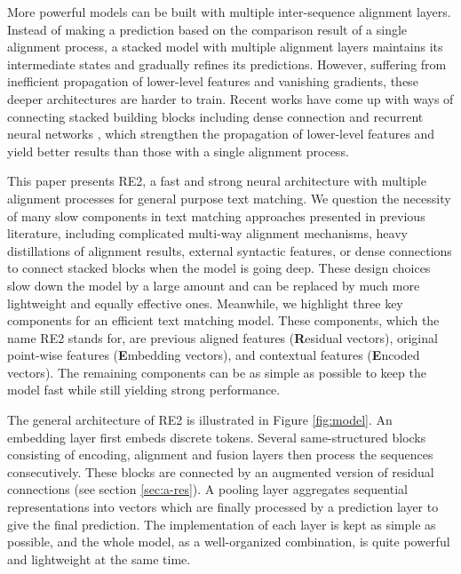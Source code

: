 \documentclass[11pt,a4paper]{article}
\begin{document}
More powerful models can be built with multiple inter-sequence alignment layers.
Instead of making a prediction based on the comparison result of a single alignment process, a stacked model with multiple alignment layers maintains its intermediate states and gradually refines its predictions. 
However, suffering from inefficient propagation of lower-level features and vanishing gradients, these deeper architectures are harder to train. Recent works have come up with ways of connecting stacked building blocks including dense connection \cite{tay2018co, kim2018semantic} and recurrent neural networks \cite{liu2018stochastic}, which strengthen the propagation of lower-level features and yield better results than those with a single alignment process.

This paper presents RE2, a fast and strong neural architecture with multiple alignment processes for general purpose text matching. 
We question the necessity of many slow components in text matching approaches presented in previous literature, including complicated multi-way alignment mechanisms, heavy distillations of alignment results, external syntactic features, or dense connections to connect stacked blocks when the model is going deep. 
These design choices slow down the model by a large amount and can be replaced by much more lightweight and equally effective ones. 
Meanwhile, we highlight three key components for an efficient text matching model. These components, which the name RE2 stands for, are
previous aligned features (\textbf{R}esidual vectors), original point-wise features (\textbf{E}mbedding vectors), and contextual features (\textbf{E}ncoded vectors). The remaining components can be as simple as possible to keep the model fast while still yielding strong performance.

The general architecture of RE2 is illustrated in Figure \ref{fig:model}. An embedding layer first embeds discrete tokens. Several same-structured blocks consisting of encoding, alignment and fusion layers then process the sequences consecutively. These blocks are connected by an augmented version of residual connections (see section \ref{sec:a-res}). A pooling layer aggregates sequential representations into vectors which are finally processed by a prediction layer to give the final prediction. The implementation of each layer is kept as simple as possible, and the whole model, as a well-organized combination, is quite powerful and lightweight at the same time.
\end{document}
